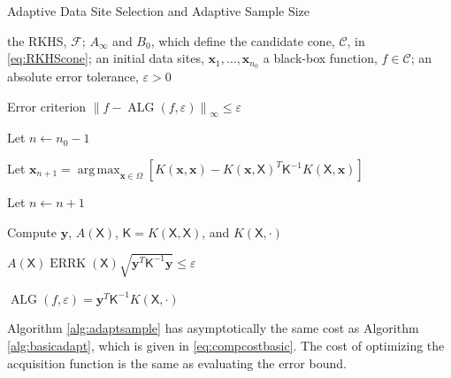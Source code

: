 \documentclass[]{mcom-l}
\theoremstyle{plain}
\theoremstyle{definition}
\DeclareMathOperator*{\argmax}{arg\,max}
\DeclareMathOperator{\ALG}{ALG}
\DeclareMathOperator{\errK}{ERRK}
\newcommand{\mK}{\mathsf{K}}
\newcommand{\mX}{\mathsf{X}}
\newcommand{\bx}{{\boldsymbol{x}}}
\newcommand{\by}{{\boldsymbol{y}}}
\newcommand{\cc}{\mathcal{C}}
\newcommand{\calf}{{\mathcal{F}}}
\newcommand{\norm}[2][{}]{\ensuremath{\left \lVert #2 \right \rVert}_{#1}}
\begin{document}
\begin{algorithm}[H]
	\caption{Adaptive Data Site Selection and Adaptive Sample Size \label{alg:adaptsample}}
	\begin{algorithmic}
		\PARAM the RKHS, $\calf$; $A_\infty$ and $B_0$, which define  the candidate cone, $\cc$, in \eqref{eq:RKHScone}; an initial data sites, $\bx_1, \ldots, \bx_{n_0}$
		\INPUT a black-box function, $f \in \cc$; an absolute error tolerance, $\varepsilon>0$
		
		\Ensure Error criterion $\norm[\infty]{f - \ALG(f,\varepsilon)} \le \varepsilon$
		
		\State Let $n \leftarrow n_0 -1$
		
		\Repeat
		
		
		\State Let $ \bx_{n+1} = \displaystyle \argmax_{\bx \in \Omega} [K(\bx,\bx) - K(\bx,\mX)^T \mK^{-1} K(\mX,\bx)]$
		
		\EndIf
		
		\State Let $n \leftarrow n + 1$
		
		\State Compute $\by$, $A(\mX)$, $\mK = K(\mX,\mX)$, and $K(\mX,\cdot)$
		
		\Until $A(\mX) \errK(\mX) \sqrt{ \by^T \mK^{-1} \by }  \le \varepsilon$
		
		\RETURN $\ALG(f,\varepsilon) = \by^T \mK^{-1} K(\mX,\cdot)$
		
	\end{algorithmic}
\end{algorithm}

Algorithm \ref{alg:adaptsample} has asymptotically the same cost as Algorithm \ref{alg:basicadapt}, which is given in \eqref{eq:compcostbasic}.  The cost of optimizing the acquisition function is the same as evaluating the error bound.
\end{document}
